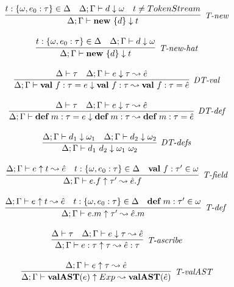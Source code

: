\begin{figure}
\centering
\[
\begin{array}{c}

\infer[\textit{T-new}]
	{\Delta; \Gamma \vdash \keyw{new}\ \{ d \} \downarrow  t }
	{ t:\{\omega,e_0:\tau\} \in \Delta & \Delta;\Gamma \vdash d \downarrow \omega & t\neq TokenStream} \\[3ex]

\infer[\textit{T-new-hat}]
	{\Delta; \Gamma \vdash \keyw{new}\ \{ d \} \downarrow  t }
	{ t:\{\omega,e_0:\tau\} \in \Delta & \Delta;\Gamma \vdash d \downarrow \omega} \\[3ex]


\infer[\textit{DT-val}]
	{\Delta; \Gamma \vdash \keyw{val}~ f:\tau = e \downarrow \keyw{val}~ f:\tau  \leadsto \keyw{val}~ f:\tau = \hat{e}}
	{\Delta \vdash \tau &\Delta; \Gamma \vdash e \downarrow \tau \leadsto \hat{e} } \\[3ex]
	
\infer[\textit{DT-def}]
	{\Delta; \Gamma \vdash \keyw{def}~ m:\tau = e \downarrow \keyw{def}~ m:\tau \leadsto \keyw{def}~ m:\tau = \hat{e} }
	{\Delta \vdash \tau  & \Delta; \Gamma \vdash e  \downarrow \tau \leadsto \hat{e} } \\[3ex]

	
\infer[\textit{DT-defs}]
	{\Delta; \Gamma \vdash d_1\ d_2 \downarrow \omega_1\ \omega_2 }
	{\Delta; \Gamma \vdash d_1 \downarrow \omega_1 &  \Delta; \Gamma \vdash d_2 \downarrow \omega_2 } \\[3ex]


\infer[\textit{T-field}]
	{\Delta; \Gamma \vdash  e.f \uparrow \tau' \leadsto \hat{e}.f} 
	{\Delta; \Gamma \vdash e \uparrow t \leadsto \hat{e} & t:\{\omega, e_0:\tau\}\in \Delta & \keyw{val}\ f:\tau' \in \omega  }\\[3ex]

 
\infer[\textit{T-def }]
	{\Delta; \Gamma \vdash  e.m \uparrow\tau' \leadsto \hat{e}.m} 
	{\Delta; \Gamma \vdash e \uparrow t \leadsto \hat{e} & t: \{\omega, e_0:\tau\} \in \Delta & \keyw{def}\ m:\tau' \in \omega }\\[3ex]

\infer[\textit{T-ascribe}]
	{\Delta; \Gamma  \vdash  e:\tau \uparrow \tau \leadsto \hat{e}:\tau}
	{\Delta \vdash \tau & \Delta; \Gamma \vdash e \downarrow \tau \leadsto \hat{e} } \\[3ex]

\infer[\textit{T-valAST}]
        {\Delta; \Gamma \vdash \keyw{valAST}(e)\uparrow Exp \leadsto \keyw{valAST}(\hat{e}) }
	{\Delta; \Gamma \vdash e \uparrow \tau \leadsto \hat{e}} \\[3ex]


\end{array}\]
\end{figure}
